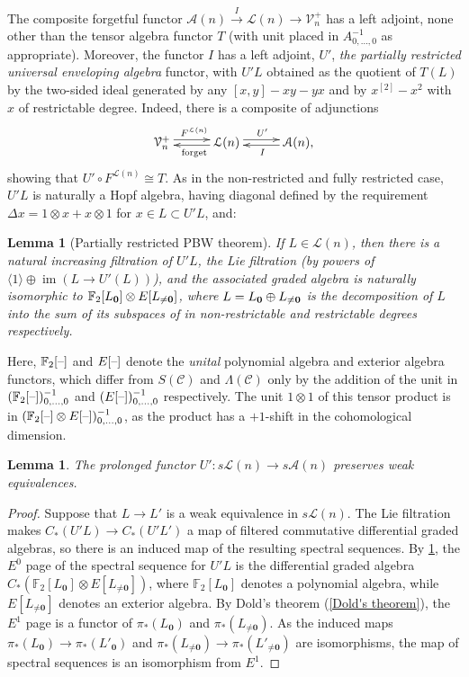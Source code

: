 \documentclass[11pt]{amsart}
\theoremstyle{plain}
\newtheorem{lem}[thm]{Lemma}
\theoremstyle{definition}
\DeclareMathOperator{\im}{im}
\newcommand{\DASH}{\textup{--}}
\renewcommand{\to}{\longrightarrow}
\newcommand{\scrC}{\mathscr{C}}
\newcommand{\calA}{\mathcal{A}}
\newcommand{\calL}{\mathcal{L}}
\newcommand{\calV}{\mathcal{V}}
\theoremstyle{plain}
\newcommand{\CommOperad}{{\scrC}}
\newcommand{\restn}[1]{#1^{[2]}}
\newcommand{\vect}[2]{\calV^{#1}_{#2}}
\newcommand{\UEA}{U'}%
\newcommand{\F}{\mathbb{F}}
\newcommand{\Ftwo}{\F_2}
\begin{document}
\begin{appendices}
The composite forgetful functor $\calA(n)\overset{I}{\to}\calL(n)\to\vect{+}{n}$ has a left adjoint, none other than the tensor algebra functor $T$ (with unit placed in $A^{-1}_{0,\ldots,0}$ as appropriate). Moreover, the functor $I$ has a left adjoint, $\UEA$, \emph{the partially restricted universal enveloping algebra} functor, with $\UEA L$ obtained as the quotient of $T(L)$ by the two-sided ideal generated by any $[x,y]-xy-yx$ and by $\restn{x}-x^2$ with $x$ of restrictable degree. Indeed, there is a composite of adjunctions
\[\xymatrix@R=.3cm@C=1cm{
\vect{+}{n}  \ar@<.6ex>[r]^{F^{\calL(n)}}&
\calL(n)  \ar@<.4ex>[l]^{\textup{forget}} \ar@<.6ex>[r]^{\UEA}&
\calA(n),  \ar@<.4ex>[l]^{I} 
}
\]
showing that $\UEA\circ F^{\calL(n)}\cong T$. As in the non-restricted and fully restricted case, $\UEA L$ is naturally a Hopf algebra, having diagonal defined by the requirement $\Delta x=1\otimes x+x\otimes 1$ for $x\in L\subset \UEA L$, and:
\begin{lem}[Partially restricted PBW theorem]\label{Partially restricted PBW theorem}
If $L\in\calL(n)$, then there is a natural increasing filtration of $\UEA L$, the Lie filtration (by powers of $\langle 1\rangle\oplus \im(L\to \UEA(L))$), and the associated graded algebra is naturally isomorphic to $\Ftwo [L_{\textup{\textbf{0}}}]\otimes E[L_{\neq\textup{\textbf{0}}}]$, where $L=L_{\textbf{\textup{0}}}\oplus L_{\neq\textbf{\textup{0}}}$ is the decomposition of $L$ into the sum of its subspaces of in non-restrictable and restrictable degrees respectively.
\end{lem}
Here, $\Ftwo [\DASH]$ and $E[\DASH]$ denote the \emph{unital} polynomial algebra and exterior algebra functors, which differ from $S(\CommOperad)$ and $\Lambda(\CommOperad)$ only by the addition of the unit in $(\Ftwo [\DASH])^{-1}_{0,\ldots,0}$ and $(E[\DASH])^{-1}_{0,\ldots,0}$ respectively. The unit $1\otimes1 $ of this tensor product is in $(\Ftwo [\DASH]\otimes E[\DASH])^{-1}_{0,\ldots,0}$, as the product has a $+1$-shift in the cohomological dimension.
\begin{lem}
The prolonged functor $\UEA:s\calL(n)\to s\calA(n)$ preserves weak equivalences.
\end{lem}
\begin{proof}
Suppose that $L\to L'$ is a weak equivalence in $s\calL(n)$. The Lie filtration makes $C_*(\UEA L)\to C_*(\UEA L')$ a map of filtered commutative differential graded algebras, so there is an induced map of the resulting spectral sequences. By \ref{Partially restricted PBW theorem}, the $E^0$ page of the spectral sequence for $\UEA L$ is the differential graded algebra $C_*(\Ftwo [L_{\textbf{0}}]\otimes E[L_{\neq\textbf{0}}])$, where $\Ftwo [L_{\textbf{0}}]$ denotes a polynomial algebra, while $E[L_{\neq\textbf{0}}]$ denotes an exterior algebra. By Dold's theorem (\ref{Dold's theorem}), the $E^1$ page is a functor of $\pi_*(L_{\textbf{0}})$ and $\pi_*(L_{\neq\textbf{0}})$. As the induced maps $\pi_*(L_{\textbf{0}})\to\pi_*(L'_{\textbf{0}})$ and $\pi_*(L_{\neq\textbf{0}})\to\pi_*(L'_{\neq\textbf{0}})$ are isomorphisms, the map of spectral sequences is an isomorphism from $E^1$.
\end{proof}


\end{appendices}
\end{document}
